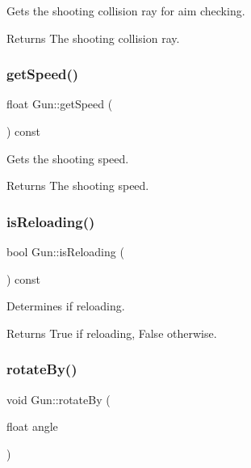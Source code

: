 Gets the shooting collision ray for aim checking. 

\begin{DoxyReturn}{Returns}
The shooting collision ray. 
\end{DoxyReturn}
\mbox{\label{class_gun_a634b932ce487fb5f3c744d4909bb34e5}} 
\subsubsection{\texorpdfstring{getSpeed()}{getSpeed()}}
{\footnotesize\ttfamily float Gun\+::get\+Speed (\begin{DoxyParamCaption}{ }\end{DoxyParamCaption}) const\hspace{0.3cm}{\ttfamily [inline]}}



Gets the shooting speed. 

\begin{DoxyReturn}{Returns}
The shooting speed. 
\end{DoxyReturn}
\mbox{\label{class_gun_af85b97414bec9c7374548562da235973}} 
\subsubsection{\texorpdfstring{isReloading()}{isReloading()}}
{\footnotesize\ttfamily bool Gun\+::is\+Reloading (\begin{DoxyParamCaption}{ }\end{DoxyParamCaption}) const\hspace{0.3cm}{\ttfamily [inline]}}



Determines if reloading. 

\begin{DoxyReturn}{Returns}
True if reloading, False otherwise. 
\end{DoxyReturn}
\mbox{\label{class_gun_ac33af2c44dffe022a1446b235e2ba034}} 
\subsubsection{\texorpdfstring{rotateBy()}{rotateBy()}}
{\footnotesize\ttfamily void Gun\+::rotate\+By (\begin{DoxyParamCaption}\item[{float}]{angle }\end{DoxyParamCaption})}



